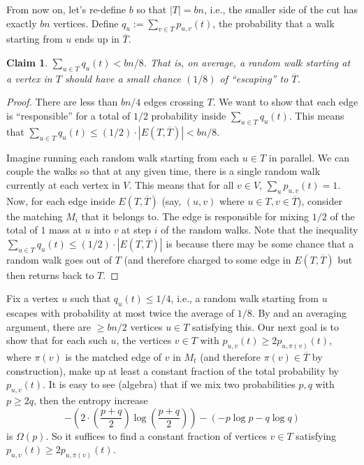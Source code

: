 \documentclass{article}
\newtheorem{claim}[theorem]{Claim}
\begin{document}
From now on, let's re-define $b$ so that $|T|=bn$, i.e., the smaller side of the cut has exactly $bn$ vertices. Define $q_u:=\sum_{v\in\overline T}p_{u,v}(t)$, the probability that a walk starting from $u$ ends up in $\overline T$.

\begin{claim}\label{clm:1}
$\sum_{u\in T}q_u(t)<bn/8$. That is, on average, a random walk starting at a vertex in $T$ should have a small chance $(1/8)$ of ``escaping'' to $\overline T$.
\end{claim}
\begin{proof}
There are less than $bn/4$ edges crossing $T$. We want to show that each edge is ``responsible'' for a total of $1/2$ probability inside $\sum_{u\in T}q_u(t)$. This means that $\sum_{u\in T}q_u(t)\le(1/2)\cdot |E(T,\overline T)|<bn/8$.

Imagine running each random walk starting from each $u\in T$ in parallel. We can couple the walks so that at any given time, there is a single random walk currently at each vertex in $V$. This means that for all $v\in V$, $\sum_u p_{u,v}(t)=1$. Now, for each edge inside $E(T,\overline T)$ (say, $(u,v)$ where $u\in T,v\in\overline T$), consider the matching $M_i$ that it belongs to. The edge is responsible for mixing $1/2$ of the total of $1$ mass at $u$ into $v$ at step $i$ of the random walks. Note that the inequality $\sum_{u\in T}q_u(t)\le(1/2)\cdot |E(T,\overline T)|$ is because there may be some chance that a random walk goes out of $T$ (and therefore charged to some edge in $E(T,\overline T)$ but then returns back to $T$.
\end{proof}

Fix a vertex $u$ such that $q_u(t)\le1/4$, i.e., a random walk starting from $u$ escapes with probability at most twice the average of $1/8$. By  and an averaging argument, there are $\ge bn/2$ vertices $u\in T$ satisfying this. Our next goal is to show that for each such $u$, the vertices $v\in T$ with $p_{u,v}(t) \ge 2p_{u,\pi(v)}(t)$, where $\pi(v)$ is the matched edge of $v$ in $M_t$ (and therefore $\pi(v)\in\overline T$ by construction), make up at least a constant fraction of the total probability by $p_{u,v}(t)$. It is easy to see (algebra) that if we mix two probabilities $p,q$ with $p\ge2q$, then the entropy increase
\[ -\left( 2 \cdot \left(\frac{p+q}2\right)\log\left(\frac{p+q}2\right)\right) - \left( -p\log p-q\log q \right) \]
is $\Omega(p)$. So it suffices to find a constant fraction of vertices $v\in T$ satisfying $p_{u,v}(t)\ge2p_{u,\pi(v)}(t)$.
\end{document}
